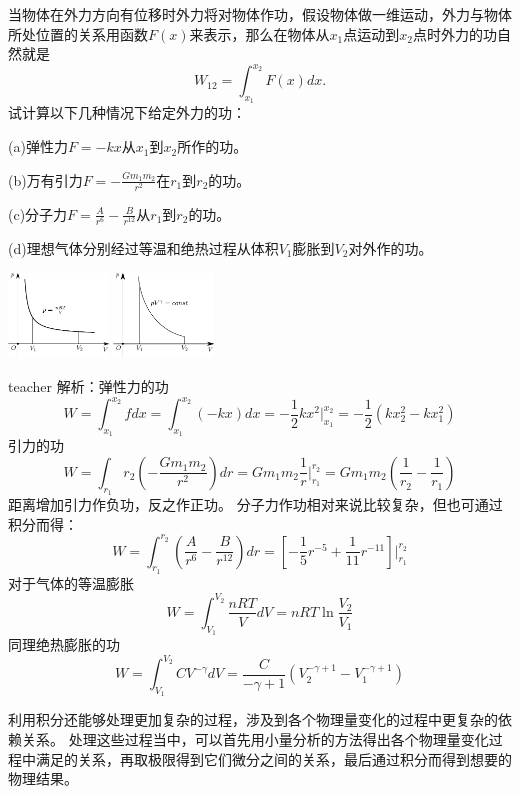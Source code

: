 \begin{example}
当物体在外力方向有位移时外力将对物体作功，假设物体做一维运动，外力与物体所处位置的关系用函数$F(x)$来表示，那么在物体从$x_1$点运动到$x_2$点时外力的功自然就是
\[
W_{12} = \int_{x_1}^{x_2}F(x)dx.
\]
试计算以下几种情况下给定外力的功：

(a)弹性力$F=-kx$从$x_1$到$x_2$所作的功。

(b)万有引力$F=-\frac{Gm_1m_2}{r^2}$在$r_1$到$r_2$的功。

(c)分子力$F=\frac{A}{r^6}-\frac{B}{r^12}$从$r_1$到$r_2$的功。

(d)理想气体分别经过等温和绝热过程从体积$V_1$膨胀到$V_2$对外作的功。
\begin{flushright}
\includegraphics[width=0.2\textwidth]{images/cal-18.pdf} 
\includegraphics[width=0.2\textwidth]{images/cal-19.pdf} 
\end{flushright}
\begin{taggedblock}{teacher}
\noindent
解析：弹性力的功
\[
W = \int_{x_1}^{x_2}fdx = \int_{x_1}^{x_2}(-kx)dx=-\frac{1}{2}kx^2\bigg |_{x_1}^{x_2}=-\frac{1}{2}(kx_2^2-kx_1^2)
\]
引力的功
\[
W = \int_{r_1}{r_2}(-\frac{Gm_1m_2}{r^2})dr = Gm_1m_2\frac{1}{r}\bigg|_{r_1}^{r_2} = Gm_1m_2(\frac{1}{r_2}-\frac{1}{r_1})
\]
距离增加引力作负功，反之作正功。
分子力作功相对来说比较复杂，但也可通过积分而得：
\[
W = \int_{r_1}^{r_2}(\frac{A}{r^6}-\frac{B}{r^12})dr = [-\frac{1}{5}r^{-5}+\frac{1}{11}r^{-11}]\bigg|_{r_1}^{r_2}
\]
对于气体的等温膨胀
\[
W=\int_{V_1}^{V_2}\frac{nRT}{V}dV=nRT\ln\frac{V_2}{V_1}
\]
同理绝热膨胀的功
\[
W=\int_{V_1}^{V_2}CV^{-\gamma}dV=\frac{C}{-\gamma +1}(V_2^{-\gamma +1}-V_1^{-\gamma +1})
\]
\end{taggedblock}
\end{example}


利用积分还能够处理更加复杂的过程，涉及到各个物理量变化的过程中更复杂的依赖关系。
处理这些过程当中，可以首先用小量分析的方法得出各个物理量变化过程中满足的关系，再取极限得到它们微分之间的关系，最后通过积分而得到想要的物理结果。

